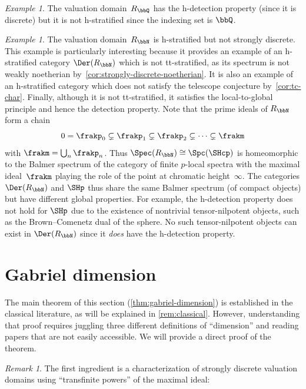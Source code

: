 \documentclass{amsart}
\numberwithin{equation}{section}%
\theoremstyle{remark}
\newtheorem{Exa}[equation]{Example}
\newtheorem{Rem}[equation]{Remark}
\begin{document}
\begin{Exa}
	The valuation domain~$R_{\bbQ}$ has the h-detection property (since it is discrete) but it is not h-stratified since the indexing set is $\bbQ$.
\end{Exa}

\begin{Exa}\label{exa:RNN}
	The valuation domain~$R_{\bbN}$ is h-stratified but not strongly discrete. This example is particularly interesting because it provides an example of an h-stratified category $\Der(R_{\bbN})$ which is not tt-stratified, as its spectrum is not weakly noetherian by~\cref{cor:strongly-discrete-noetherian}. It is also an example of an \mbox{h-stratified} category which does not satisfy the telescope conjecture by~\cref{cor:tc-char}. Finally, although it is not tt-stratified, it satisfies the local-to-global principle and hence the detection property. Note that the prime ideals of $R_\bbN$ form a chain
	\[
		0 = \frakp_0 \subsetneq \frakp_1 \subsetneq \frakp_2 \subsetneq \cdots \subsetneq \frakm
	\]
	with $\frakm = \bigcup_n \frakp_n$. Thus $\Spec(R_\bbN)\cong \Spc(\SHcp)$ is homeomorphic to the Balmer spectrum of the category of finite $p$-local spectra with the maximal ideal~$\frakm$ playing the role of the point at chromatic height~$\infty$. The categories $\Der(R_\bbN)$ and $\SHp$ thus share the same Balmer spectrum (of compact objects) but have different global properties. For example, the h-detection property does not hold for $\SHp$ due to the existence of nontrivial tensor-nilpotent objects, such as the Brown--Comenetz dual of the sphere. No such tensor-nilpotent objects can exist in $\Der(R_\bbN)$ since it \emph{does} have the h-detection property.
\end{Exa}

\section{Gabriel dimension}

The main theorem of this section (\cref{thm:gabriel-dimension}) is established in the classical literature, as will be explained in \cref{rem:classical}. However, understanding that proof requires juggling three different definitions of ``dimension'' and reading papers that are not easily accessible. We will provide a direct proof of the theorem.

\begin{Rem}
	The first ingredient is a characterization of strongly discrete valuation domains using ``transfinite powers'' of the maximal ideal:
\end{Rem}
\end{document}
